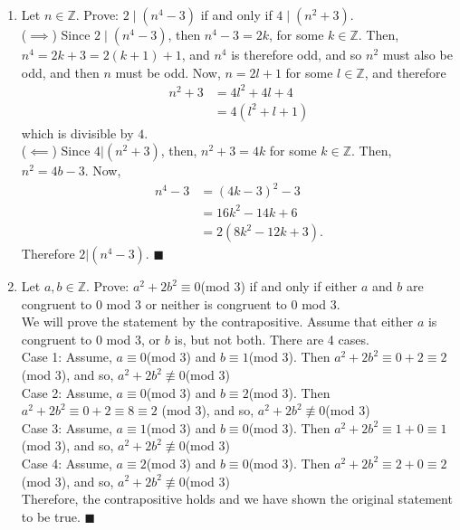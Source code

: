 \documentclass[12pt]{article}
\newcommand{\Z}{\mathbb{Z}}
\newcommand{\qed}{\(\blacksquare\)}
\begin{document}
\begin{enumerate}
        \item Let \(n\in\Z\). Prove: \(2\mid (n^4-3)\) if and only if \(4 \mid (n^2+3)\).\\
        (\(\implies\)) Since \(2\mid (n^4-3)\), then \(n^4-3=2k\), for some \(k\in\Z\). Then, \(n^4=2k+3=2(k+1)+1\), and \(n^4\) is therefore odd, and so \(n^2\) must also be odd, and then \(n\) must be odd. Now, \(n = 2l + 1\) for some \(l\in\Z\), and therefore
        \begin{equation*}
            \begin{split}
                n^2 + 3 &= 4l^2+4l+4\\
                &= 4(l^2+l+1)
            \end{split}
        \end{equation*}
        which is divisible by \(4\). \\
        (\(\impliedby\)) Since \(4|(n^2+3)\), then, \(n^2 + 3 = 4k\) for some \(k \in\Z\). Then, \(n^2 = 4b-3\). Now, 
        \begin{equation*}
            \begin{split}
                n^4 -3 &= (4k-3)^2-3\\
                &= 16k^2-14k+6\\
                &= 2(8k^2-12k+3).
            \end{split}
        \end{equation*}
        Therefore \(2|(n^4-3)\). \qed
        \item Let \(a,b\in\Z\). Prove: \(a^2 +2b^2\equiv 0\)(mod 3) if and only if either \(a\) and \(b\) are congruent to 0 mod 3 or neither is congruent to 0 mod 3.\\ We will prove the statement by the contrapositive. Assume that either \(a\) is congruent to 0 mod 3, or \(b\) is, but not both. There are 4 cases.\\
        Case 1: Assume, \(a\equiv 0\)(mod 3) and \(b\equiv1\)(mod 3). Then \(a^2+2b^2\equiv0+2\equiv2\) (mod 3), and so, \(a^2+2b^2\not\equiv 0\)(mod 3)\\
        Case 2: Assume, \(a\equiv 0\)(mod 3) and \(b\equiv2\)(mod 3). Then \(a^2+2b^2\equiv0+2\equiv8\equiv2\) (mod 3), and so, \(a^2+2b^2\not\equiv 0\)(mod 3)\\
        Case 3: Assume, \(a\equiv 1\)(mod 3) and \(b\equiv0\)(mod 3). Then \(a^2+2b^2\equiv1+0\equiv1\) (mod 3), and so, \(a^2+2b^2\not\equiv 0\)(mod 3)\\
        Case 4: Assume, \(a\equiv 2\)(mod 3) and \(b\equiv0\)(mod 3). Then \(a^2+2b^2\equiv2+0\equiv2\) (mod 3), and so, \(a^2+2b^2\not\equiv 0\)(mod 3)\\
        Therefore, the contrapositive holds and we have shown the original statement to be true. \qed
    \end{enumerate}
\end{document}
